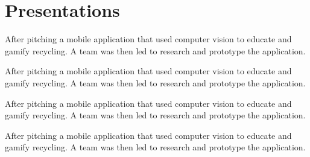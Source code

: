 \documentclass[a4paper]{deedy-resume} %
\begin{document}
\begin{minipage}[t]{0.66\textwidth} %

\section{Presentations}


After pitching a mobile application that used computer vision to educate and gamify recycling. %
A team was then led to research and prototype the application. %

\sectionspace %



After pitching a mobile application that used computer vision to educate and gamify recycling. %
A team was then led to research and prototype the application. %

\sectionspace %



After pitching a mobile application that used computer vision to educate and gamify recycling. %
A team was then led to research and prototype the application. %

\sectionspace %



After pitching a mobile application that used computer vision to educate and gamify recycling. %
A team was then led to research and prototype the application. %


\end{minipage}
\end{document}
